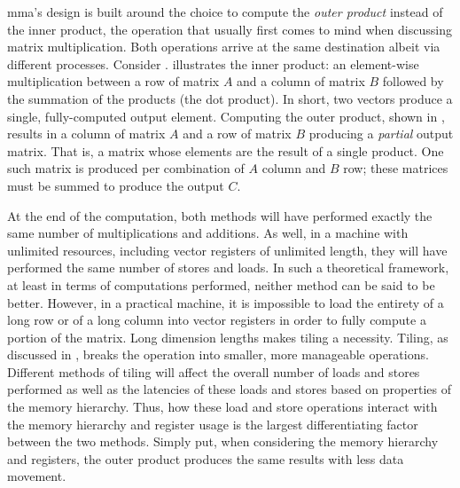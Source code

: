 \documentclass[\main/thesis.tex]{subfiles}
\begin{document}
\Gls{mma}'s design is built around the choice to compute the \emph{outer product} instead of the inner product, the operation that usually first comes to mind when discussing matrix multiplication.
Both operations arrive at the same destination albeit via different processes.
Consider .
 illustrates the inner product: an element-wise multiplication between a row of matrix $A$ and a column of matrix $B$ followed by the summation of the products (\ie the dot product).
In short, two vectors produce a single, fully-computed output element.
Computing the outer product, shown in , results in a column of matrix $A$ and a row of matrix $B$ producing a \emph{partial} output matrix.
That is, a matrix whose elements are the result of a single product.
One such matrix is produced per combination of $A$ column and $B$ row; these matrices must be summed to produce the output $C$.

At the end of the computation, both methods will have performed exactly the same number of multiplications and additions.
As well, in a machine with unlimited resources, including vector registers of unlimited length, they will have performed the same number of stores and loads.
In such a theoretical framework, at least in terms of computations performed, neither method can be said to be better.
However, in a practical machine, it is impossible to load the entirety of a long row or of a long column into vector registers in order to fully compute a portion of the matrix.
Long dimension lengths makes tiling a necessity.
Tiling, as discussed in , breaks the operation into smaller, more manageable operations.
Different methods of tiling will affect the overall number of loads and stores performed as well as the latencies of these loads and stores based on properties of the memory hierarchy.
Thus, how these load and store operations interact with the memory hierarchy and register usage is the largest differentiating factor between the two methods.
Simply put, when considering the memory hierarchy and registers, the outer product produces the same results with less data movement.
\end{document}
